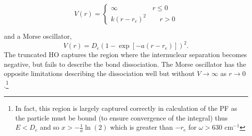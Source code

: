 \documentclass[../main.tex]{subfiles}
\begin{document}
\begin{equation}
	V(r) = \begin{cases}
		\infty \qquad\qquad\;\;\;\; r \le 0 \\
		k (r - r_e)^2 \qquad r > 0
	\end{cases}
\end{equation}

and a Morse oscillator,
\begin{equation}
	V(r) = D_e(1 - \exp\left[-a(r- r_e)\right])^2.
\end{equation}
The truncated HO captures the region where the internuclear separation becomes negative, but fails to describe the bond dissociation. The Morse oscillator has the opposite limitations describing the dissociation well but without $V \rightarrow \infty$ as $r \rightarrow 0$.\footnote{In fact, this region is largely captured correctly in calculation of the PF as the particle must be bound (to ensure convergence of the integral) thus $E < D_e$ and so $x > -\frac{1}{a}\ln(2)$ which is greater than $ -r_e$ for $\omega > 630$ cm$^{-1}$} 
\end{document}
